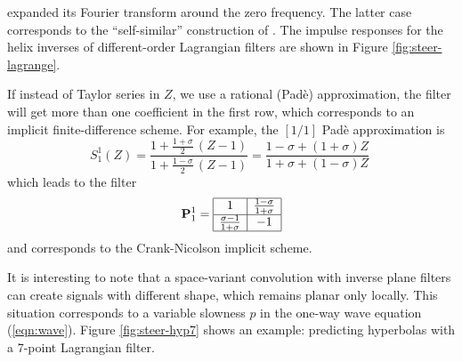 expanded its Fourier transform around the zero frequency. The latter
case corresponds to the ``self-similar'' construction of
\cite{Karrenbach.sepphd.83}. The impulse responses for the helix
inverses of different-order Lagrangian filters are shown in Figure
\ref{fig:steer-lagrange}.
\par
If instead of Taylor series in $Z$, we use a rational (Pad\`{e})
approximation, the filter will get more than one coefficient in the
first row, which corresponds to an implicit finite-difference scheme.
For example, the $[1/1]$ Pad\`{e} approximation is
\begin{equation}
  \label{eqn:pade}
  S_1^1 (Z) = \frac
  {1 + \frac{1 + \sigma}{2}\,(Z-1)}
  {1 + \frac{1 - \sigma}{2}\,(Z-1)} = \frac
  {1-\sigma + (1+\sigma) Z}
  {1+\sigma + (1-\sigma) Z}\;
\end{equation}
which leads to the filter
\begin{equation}
  \label{eqn:p11}
  \mathbf{P}_1^1 =
  \begin{array}{|c|c|}
    \hline
    1 & \frac{1-\sigma}{1+\sigma} \\ \hline
    \frac{\sigma-1}{1+\sigma} & -1 \\ \hline
  \end{array}
\end{equation}
and corresponds to the Crank-Nicolson implicit scheme. 


\par
It is interesting to note that a space-variant convolution with
inverse plane filters can create signals with different shape, which
remains planar only locally. This situation corresponds to a variable
slowness $p$ in the one-way wave equation (\ref{eqn:wave}). Figure
\ref{fig:steer-hyp7} shows an example: predicting hyperbolas with a 7-point
Lagrangian filter.

